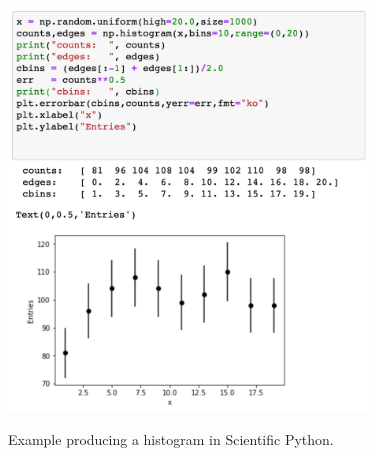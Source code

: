 \documentclass[12pt,oneside]{book}
\begin{document}
\begin{figure}[htbp]
\begin{center}
{\includegraphics[width=0.85\textwidth]{figs/makehisteg.png}} 
\end{center}
\caption{\label{fig:makehisteg} Example producing a histogram in Scientific Python.}
\end{figure}
\end{document}
